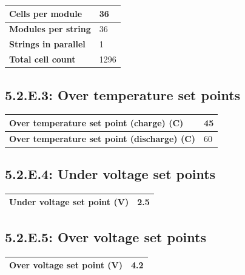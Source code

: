 \documentclass[10pt]{article}
\begin{document}
\begin{table}[!htbp]
\begin{tabular}{|l|l|}
\hline
\textbf{Cells per module}    & 36   \\ \hline
\textbf{Modules per string}  & 36   \\ \hline
\textbf{Strings in parallel} & 1    \\ \hline
\textbf{Total cell count}    & 1296 \\ \hline
\end{tabular}
\end{table}

\subsection{5.2.E.3: Over temperature set points}

\begin{table}[!htbp]
\begin{tabular}{|l|l|}
\hline
\textbf{Over temperature set point (charge) (C)}    & 45 \\ \hline
\textbf{Over temperature set point (discharge) (C)} & 60 \\ \hline
\end{tabular}
\end{table}

\subsection{5.2.E.4: Under voltage set points}

\begin{table}[!htbp]
\begin{tabular}{|l|l|}
\hline
\textbf{Under voltage set point (V)}    & 2.5 \\ \hline
\end{tabular}
\end{table}

\subsection{5.2.E.5: Over voltage set points}

\begin{table}[!htbp]
\begin{tabular}{|l|l|}
\hline
\textbf{Over voltage set point (V)}    & 4.2 \\ \hline
\end{tabular}
\end{table}
\end{document}
